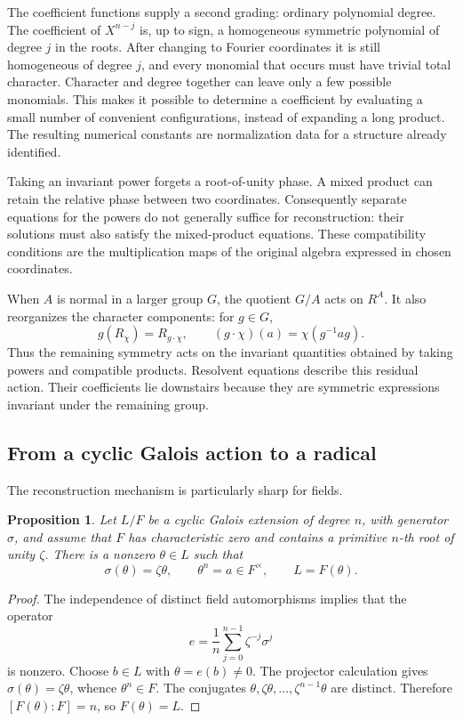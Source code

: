 \documentclass[11pt]{article}
\newtheorem{proposition}{Proposition}[section]
\theoremstyle{remark}
\begin{document}
The coefficient functions supply a second grading: ordinary polynomial degree. The coefficient of \(X^{n-j}\) is, up to sign, a homogeneous symmetric polynomial of degree \(j\) in the roots. After changing to Fourier coordinates it is still homogeneous of degree \(j\), and every monomial that occurs must have trivial total character. Character and degree together can leave only a few possible monomials. This makes it possible to determine a coefficient by evaluating a small number of convenient configurations, instead of expanding a long product. The resulting numerical constants are normalization data for a structure already identified.

Taking an invariant power forgets a root-of-unity phase. A mixed product can retain the relative phase between two coordinates. Consequently separate equations for the powers do not generally suffice for reconstruction: their solutions must also satisfy the mixed-product equations. These compatibility conditions are the multiplication maps of the original algebra expressed in chosen coordinates.

When \(A\) is normal in a larger group \(G\), the quotient \(G/A\) acts on \(R^A\). It also reorganizes the character components: for \(g\in G\),
\[
g(R_\chi)=R_{g\cdot\chi},
\qquad
(g\cdot\chi)(a)=\chi(g^{-1}ag).
\]
Thus the remaining symmetry acts on the invariant quantities obtained by taking powers and compatible products. Resolvent equations describe this residual action. Their coefficients lie downstairs because they are symmetric expressions invariant under the remaining group.

\subsection{From a cyclic Galois action to a radical}

The reconstruction mechanism is particularly sharp for fields.

\begin{proposition}
\label{fourier:kummer}
Let \(L/F\) be a cyclic Galois extension of degree \(n\), with generator \(\sigma\), and assume that \(F\) has characteristic zero and contains a primitive \(n\)-th root of unity \(\zeta\). There is a nonzero \(\theta\in L\) such that
\[
\sigma(\theta)=\zeta\theta,
\qquad
\theta^n=a\in F^\times,
\qquad
L=F(\theta).
\]
\end{proposition}

\begin{proof}
The independence of distinct field automorphisms implies that the operator
\[
e=\frac1n\sum_{j=0}^{n-1}\zeta^{-j}\sigma^j
\]
is nonzero. Choose \(b\in L\) with \(\theta=e(b)\ne0\). The projector calculation gives \(\sigma(\theta)=\zeta\theta\), whence \(\theta^n\in F\). The conjugates \(\theta,\zeta\theta,\ldots,\zeta^{n-1}\theta\) are distinct. Therefore \([F(\theta):F]=n\), so \(F(\theta)=L\).
\end{proof}
\end{document}
